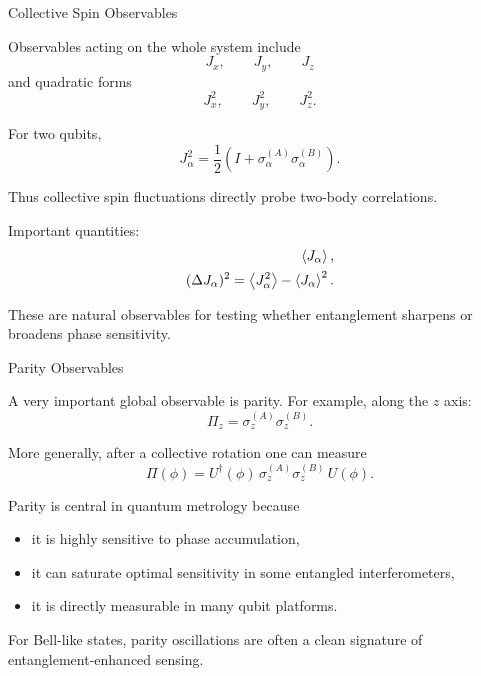 \documentclass{beamer}
\begin{document}
\begin{frame}{Collective Spin Observables}

Observables acting on the whole system include
\[
J_x,\qquad J_y,\qquad J_z
\]
and quadratic forms
\[
J_x^2,\qquad J_y^2,\qquad J_z^2.
\]

For two qubits,
\[
J_\alpha^2 = \frac{1}{2}\left(I+\sigma_\alpha^{(A)}\sigma_\alpha^{(B)}\right).
\]

Thus collective spin fluctuations directly probe two-body correlations.

Important quantities:
\begin{align}
\expval{J_\alpha}, \\
(\Delta J_\alpha)^2 = \expval{J_\alpha^2}-\expval{J_\alpha}^2.
\end{align}

These are natural observables for testing whether entanglement sharpens or broadens phase sensitivity.

\end{frame}

\begin{frame}{Parity Observables}

A very important global observable is parity.
For example, along the $z$ axis:
\[
\Pi_z = \sigma_z^{(A)}\sigma_z^{(B)}.
\]

More generally, after a collective rotation one can measure
\[
\Pi(\phi) = U^\dagger(\phi)\,\sigma_z^{(A)}\sigma_z^{(B)}\,U(\phi).
\]

Parity is central in quantum metrology because
\begin{itemize}
    \item it is highly sensitive to phase accumulation,
    \item it can saturate optimal sensitivity in some entangled interferometers,
    \item it is directly measurable in many qubit platforms.
\end{itemize}

For Bell-like states, parity oscillations are often a clean signature of entanglement-enhanced sensing.

\end{frame}
\end{document}
